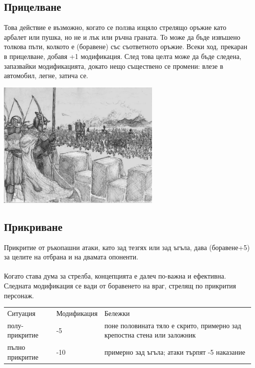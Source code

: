 \begin{multicols}{2}
\subsection{Прицелване}
Това действие е възможно, когато се ползва изцяло стрелящо оръжие като арбалет или пушка, но не и лък или ръчна граната.
То може да бъде извъшено толкова пъти, колкото е (боравене) със съответното оръжие.
Всеки ход, прекаран в прицелване, добавя +1 модификация.
След това целта може да бъде следена, запазвайки модификацията, докато нещо съществено се промени: влезе в автомобил, легне, затича се.


\includegraphics[width=0.6\textwidth]{../images/siege}~


\subsection{Прикриване}
Прикритие от ръкопашни атаки, като зад тезгях или зад ъгъла, дава (боравене+5) за целите на отбрана и на двамата опоненти.
\\
\\
Когато става дума за стрелба, концепцията е далеч по-важна и ефективна.
Следната модификация се вади от боравенето на враг, стрелящ по прикрития персонаж.
\\
\begin{tabular}{p{2cm} | p{1cm} | p{5cm}}
Ситуация        & Модификация & Бележки \\
полу-прикритие  & -5          & поне половината тяло е скрито, примерно зад крепостна стена или заложник \\
пълно прикритие & -10         & примерно зад ъгъла; атаки търпят -5 наказание                            \\
\end{tabular}
\end{multicols}

